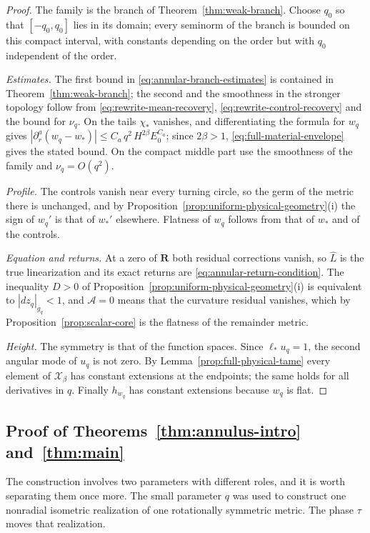 \begin{proof}
The family is the branch of Theorem~\ref{thm:weak-branch}. Choose
$q_0$ so that $[-q_0,q_0]$ lies in its domain; every seminorm of the
branch is bounded on this compact interval, with constants depending
on the order but with $q_0$ independent of the order.

\emph{Estimates.} The first bound in
\eqref{eq:annular-branch-estimates} is contained in
Theorem~\ref{thm:weak-branch}; the second and the smoothness in the
stronger topology follow from
\eqref{eq:rewrite-mean-recovery}, \eqref{eq:rewrite-control-recovery}
and the bound for $\nu_q$. On the tails $\chi_*$ vanishes, and
differentiating the formula for $w_q$ gives
$|\partial_r^a(w_q-w_*)|\le C_a\,q^2\,H^{2\beta}E_0^{C_a}$; since
$2\beta>1$, \eqref{eq:full-material-envelope} gives the stated bound.
On the compact middle part use the smoothness of the family and
$\nu_q=O(q^2)$.

\emph{Profile.} The controls vanish near every turning circle, so the
germ of the metric there is unchanged, and by
Proposition~\ref{prop:uniform-physical-geometry}(i) the sign of
$w_q'$ is that of $w_*'$ elsewhere. Flatness of $w_q$ follows from
that of $w_*$ and of the controls.

\emph{Equation and returns.} At a zero of $\mathbf R$ both residual
corrections vanish, so $\widehat L$ is the true linearization and its
exact returns are \eqref{eq:annular-return-condition}. The inequality
$D>0$ of Proposition~\ref{prop:uniform-physical-geometry}(i) is
equivalent to $|dz_q|_{g_q}<1$, and $\mathcal A=0$ means that the
curvature residual vanishes, which by
Proposition~\ref{prop:scalar-core} is the flatness of the remainder
metric.

\emph{Height.} The symmetry is that of the function spaces. Since
$\ell_*u_q=1$, the second angular mode of $u_q$ is not zero. By
Lemma~\ref{prop:full-physical-tame} every element of
$\mathcal X_\beta$ has constant extensions at the endpoints; the same
holds for all derivatives in $q$. Finally $h_{w_q}$ has constant
extensions because $w_q$ is flat.
\end{proof}

\subsection{Proof of Theorems~\ref{thm:annulus-intro} and~\ref{thm:main}}

The construction involves two parameters with different roles, and it
is worth separating them once more. The small parameter $q$ was used
to construct one nonradial isometric realization of one rotationally
symmetric metric. The phase $\tau$ moves that realization.

